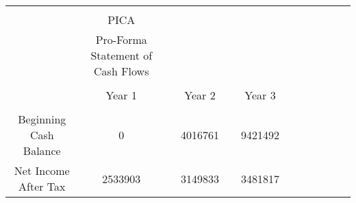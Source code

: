 {\begin{longtable}[c]{|c|c|c|c|c|c|c|c|c|c|c|c|}
\hline
                                                                                                                                &                                   &  &              &  &           &  &           &  &           &  &           \\
\hline
                                                                                                                                &                                   &  &              &  &           &  &           &  &           &  &           \\
\hline
                                                                                                                                & PICA                              &  &              &  &           &  &           &  &           &  &           \\
\hline
                                                                                                                                & Pro-Forma Statement of Cash Flows &  &              &  &           &  &           &  &           &  &           \\
\hline
                                                                                                                                &                                   &  &              &  &           &  &           &  &           &  &           \\
\hline
                                                                                                                                & Year 1                            &  & Year 2       &  & Year 3    &  &           &  &           &  &           \\
\hline
                                                                                                                                &                                   &  &              &  &           &  &           &  &           &  &           \\
\hline
Beginning Cash Balance                                                                                                          & 0                                 &  & 4016761      &  & 9421492   &  &           &  &           &  &           \\
\hline
Net Income After Tax                                                                                                            & 2533903                           &  & 3149833      &  & 3481817   &  &           &  &           &  &           \\

\end{longtable}}
